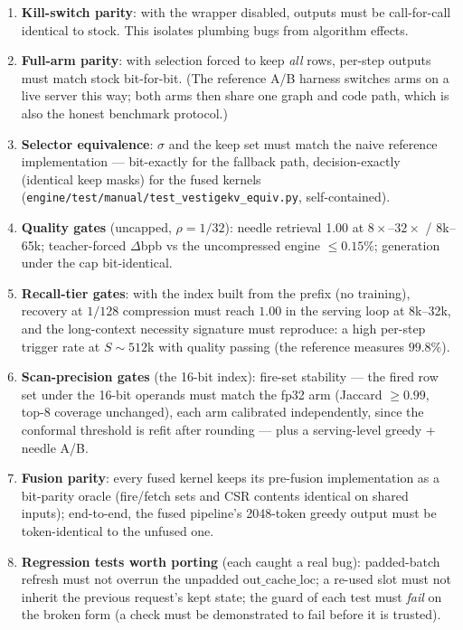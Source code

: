 \documentclass[11pt]{article}
\begin{document}
\begin{enumerate}[itemsep=2pt]
\item \textbf{Kill-switch parity}: with the wrapper disabled, outputs must
be call-for-call identical to stock. This isolates plumbing bugs from
algorithm effects.
\item \textbf{Full-arm parity}: with selection forced to keep \emph{all}
rows, per-step outputs must match stock bit-for-bit. (The reference A/B
harness switches arms on a live server this way; both arms then share one
graph and code path, which is also the honest benchmark protocol.)
\item \textbf{Selector equivalence}: $\sigma$ and the keep set must match
the naive reference implementation --- bit-exactly for the fallback path,
decision-exactly (identical keep masks) for the fused kernels
(\texttt{engine/test/manual/test\_vestigekv\_equiv.py}, self-contained).
\item \textbf{Quality gates} (uncapped, $\rho{=}1/32$): needle retrieval
1.00 at $8\times$--$32\times$ / 8k--65k; teacher-forced $\Delta$bpb vs the
uncompressed engine $\le 0.15\%$; generation under the cap bit-identical.
\item \textbf{Recall-tier gates}: with the index built from the prefix (no
training), recovery at $1/128$ compression must reach $1.00$ in the serving
loop at 8k--32k, and the long-context necessity signature must reproduce: a
high per-step trigger rate at $S{\sim}512$k with quality passing (the
reference measures $99.8\%$).
\item \textbf{Scan-precision gates} (the 16-bit index): fire-set stability
--- the fired row set under the 16-bit operands must match the fp32 arm
(Jaccard $\ge 0.99$, top-8 coverage unchanged), each arm calibrated
independently, since the conformal threshold is refit after rounding ---
plus a serving-level greedy + needle A/B.
\item \textbf{Fusion parity}: every fused kernel keeps its pre-fusion
implementation as a bit-parity oracle (fire/fetch sets and CSR contents
identical on shared inputs); end-to-end, the fused pipeline's 2048-token
greedy output must be token-identical to the unfused one.
\item \textbf{Regression tests worth porting} (each caught a real bug):
padded-batch refresh must not overrun the unpadded
$\mathrm{out\_cache\_loc}$; a re-used slot must not inherit the previous
request's kept state; the guard of each test must \emph{fail} on the broken
form (a check must be demonstrated to fail before it is trusted).
\end{enumerate}
\end{document}
